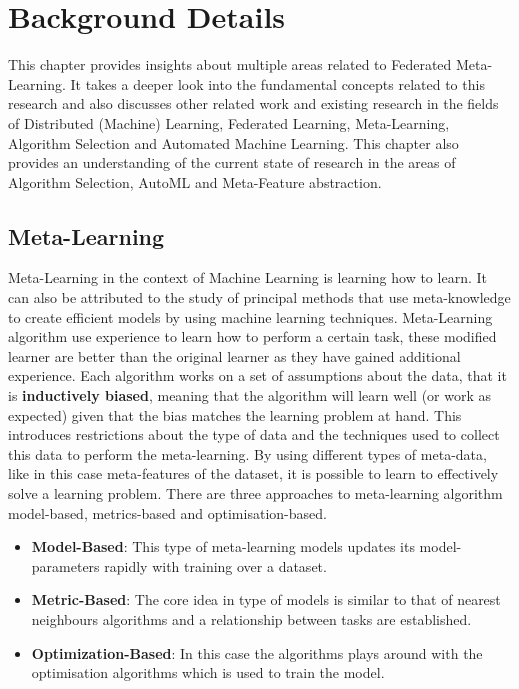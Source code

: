 \chapter{Background Details}

This chapter provides insights about multiple areas related to Federated Meta-Learning. It takes a deeper look into the fundamental concepts related to this research and also discusses other related work and existing research in the fields of Distributed (Machine) Learning, Federated Learning, Meta-Learning, Algorithm Selection and Automated Machine Learning. This chapter also provides an understanding of the current state of research in the areas of Algorithm Selection, AutoML and Meta-Feature abstraction.

\section{Meta-Learning}
Meta-Learning in the context of Machine Learning is learning how to learn. It can also be attributed to the study of principal methods that use meta-knowledge to create efficient models by using machine learning techniques. Meta-Learning algorithm use experience to learn how to perform a certain task, these modified learner are better than the original learner as they have gained additional experience. Each algorithm works on a set of assumptions about the data, that it is \textbf{inductively biased}, meaning that the algorithm will learn well (or work as expected) given that the bias matches the learning problem at hand. This introduces restrictions about the type of data and the techniques used to collect this data to perform the meta-learning. By using different types of meta-data, like in this case meta-features of the dataset, it is possible to learn to effectively solve a learning problem. There are three approaches to meta-learning algorithm model-based, metrics-based and optimisation-based.

\begin{itemize}
    \item \textbf{Model-Based}:
    This type of meta-learning models updates its model-parameters rapidly with training over a dataset.
    \item \textbf{Metric-Based}:
    The core idea in type of models is similar to that of nearest neighbours algorithms and a relationship between tasks are established.
    \item \textbf{Optimization-Based}:
    In this case the algorithms plays around with the optimisation algorithms which is used to train the model.
\end{itemize}

